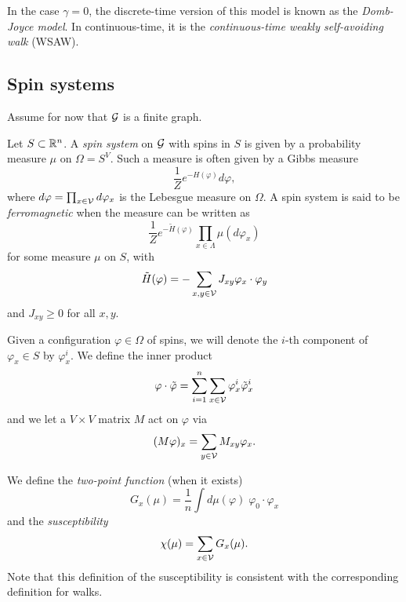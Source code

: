 In the case $\gamma = 0$, the discrete-time version of this model is known as
the \emph{Domb-Joyce model}. In continuous-time, it is the \emph{continuous-time
weakly self-avoiding walk} (WSAW).


\subsection{Spin systems}

Assume for now that $\mathcal{G}$ is a finite graph.

Let $S \subset {\mathbb R}^n$. A \emph{spin system} on $\mathcal{G}$ with spins in $S$ is given
by a probability measure $\mu$ on $\Omega = S^V$. Such a measure is often given by a
Gibbs measure
\begin{equation}
\frac{1}{Z} e^{-H(\varphi)} d\varphi,
\end{equation}
where $d\varphi = \prod_{x\in\mathcal{V}} d\varphi_x$ is the Lebesgue measure on
$\Omega$. A spin system is said to be \emph{ferromagnetic} when the measure can
be written as
\begin{equation}
\frac{1}{Z} e^{-\tilde H(\varphi)} \prod_{x\in\Lambda} \mu(d\varphi_x)
\end{equation}
for some measure $\mu$ on $S$, with
\begin{equation}
\tilde H(\varphi) = -\sum_{x, y \in \mathcal{V}} J_{xy} \varphi_x \cdot \varphi_y
\end{equation}
and $J_{xy} \ge 0$ for all $x, y$.

Given a configuration $\varphi \in \Omega$
of spins, we will denote the $i$-th component of $\varphi_x \in S$ by $\varphi^i_x$.
We define the inner product
\begin{equation}
\varphi \cdot \tilde\varphi = \sum_{i=1}^n \sum_{x\in\mathcal{V}} \varphi^i_x \tilde\varphi^i_x
\end{equation}
and we let a $V \times V$ matrix $M$ act on $\varphi$ via
\begin{equation}
(M\varphi)_x = \sum_{y\in\mathcal{V}} M_{xy} \varphi_x.
\end{equation}

We define the \emph{two-point function} (when it exists)
\begin{equation}
G_x(\mu) = \frac{1}{n} \int d\mu(\varphi) \; \varphi_0 \cdot \varphi_x
\end{equation}
and the \emph{susceptibility}
\begin{equation}
\chi(\mu) = \sum_{x\in\mathcal{V}} G_x(\mu).
\end{equation}
Note that this definition of the susceptibility is consistent with the corresponding
definition for walks.


